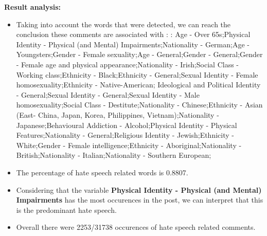 \documentclass[11pt]{article}
\begin{document}
\textbf{\Large Result analysis:}

\begin{itemize}\item Taking into account the words that were detected, we can reach the conclusion these comments are associated with : : Age - Over 65s;Physical Identity - Physical (and Mental) Impairments;Nationality - German;Age - Youngsters;Gender - Female sexuality;Age - General;Gender - General;Gender - Female age and physical appearance;Nationality - Irish;Social Class - Working class;Ethnicity - Black;Ethnicity - General;Sexual Identity - Female homosexuality;Ethnicity - Native-American; Ideological and Political Identity - General;Sexual Identity - General;Sexual Identity - Male homosexuality;Social Class - Destitute;Nationality - Chinese;Ethnicity - Asian (East- China, Japan, Korea, Philippines, Vietnam);Nationality - Japanese;Behavioural Addiction - Alcohol;Physical Identity - Physical Features;Nationality - General;Religious Identity - Jewish;Ethnicity - White;Gender - Female intelligence;Ethnicity - Aboriginal;Nationality - British;Nationality - Italian;Nationality - Southern European;%

\item The percentage of hate speech related words is 0.8807.

\item Considering that the variable \textbf{Physical Identity - Physical (and Mental) Impairments} has the most occurences in the post, we can interpret that this is the predominant hate speech.

\item Overall there were 2253/31738 occurences of hate speech related comments.\end{itemize}
\end{document}

